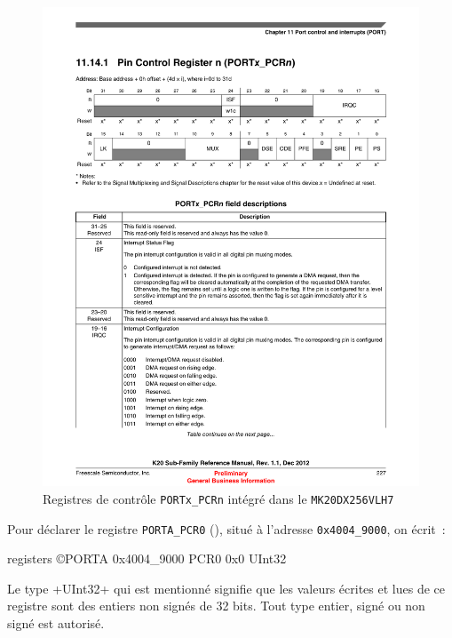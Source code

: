 \begin{figure}[htbp]
\centering
\includegraphics[width=14cm]{chapitres/PORTx_PCRn.pdf}
\caption{Registres de contrôle \texttt{PORTx\_PCRn} intégré dans le \texttt{MK20DX256VLH7}}
\end{figure}









Pour déclarer le registre \texttt{PORTA\_PCR0} (), situé à l'adresse \texttt{0x4004\_9000}, on écrit~:

\begin{PLM}
registers ©PORTA 0x4004_9000 {
  PCR0 0x0 UInt32
}
\end{PLM}

Le type \plm+UInt32+ qui est mentionné signifie que les valeurs écrites et lues de ce registre sont des entiers non signés de 32 bits. Tout type entier, signé ou non signé est autorisé.

